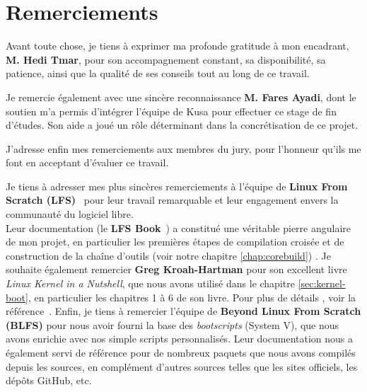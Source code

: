\chapter*{Remerciements}


Avant toute chose, je tiens à exprimer ma profonde gratitude à mon encadrant, \textbf{M. Hedi Tmar}, pour son accompagnement constant, sa disponibilité, sa patience, ainsi que la qualité de ses conseils tout au long de ce travail.

\bigbreak

Je remercie également avec une sincère reconnaissance \textbf{M. Fares Ayadi}, dont le soutien m’a permis d’intégrer l’équipe de Kusa pour effectuer ce stage de fin d’études. Son aide a joué un rôle déterminant dans la concrétisation de ce projet.

\bigbreak

J’adresse enfin mes remerciements aux membres du jury, pour l’honneur qu’ils me font en acceptant d’évaluer ce travail. 

\bigbreak
Je tiens à adresser mes plus sincères remerciements à l’équipe de \textbf{Linux From Scratch (LFS)}~\cite{lfs} pour leur travail remarquable et leur engagement envers la communauté du logiciel libre.\\
Leur documentation (le \textbf{LFS Book}~\cite{lfs_book}) a constitué une véritable pierre angulaire de mon projet, en particulier les premières étapes de compilation croisée et de construction de la chaîne d’outils (voir notre chapitre  \ref{chap:corebuild}) .
\bigbreak
Je souhaite également remercier \textbf{Greg Kroah-Hartman} pour son excellent livre \textit{Linux Kernel in a Nutshell}, que nous avons utilisé dans le chapitre \ref{sec:kernel-boot}, en particulier les chapitres 1 à 6 de son livre. Pour plus de détails , voir la référence~\cite{linux_nutshell}.
\bigbreak
Enfin, je tiens à remercier l’équipe de \textbf{Beyond Linux From Scratch (BLFS)} \cite{blfs} pour nous avoir fourni la base des \textit{bootscripts} (System V), que nous avons enrichie avec nos simple  scripts personnalisés. Leur documentation nous a également servi de référence pour de nombreux paquets que nous avons compilés depuis les sources, en complément d’autres sources telles que les sites officiels, les dépôts GitHub, etc.













\clearpage